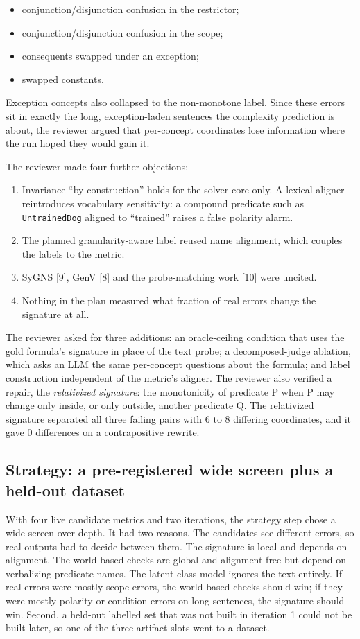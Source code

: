 \documentclass[11pt,letterpaper]{article}
\begin{document}
\begin{itemize}
\item {}conjunction/disjunction confusion in the restrictor;
\item {}conjunction/disjunction confusion in the scope;
\item {}consequents swapped under an exception;
\item {}swapped constants.
\end{itemize}
Exception concepts also collapsed to the non-monotone label. Since these errors sit in exactly the long, exception-laden sentences the complexity prediction is about, the reviewer argued that per-concept coordinates lose information where the run hoped they would gain it.

The reviewer made four further objections:

\begin{enumerate}
\item {}Invariance ``by construction'' holds for the solver core only. A lexical aligner reintroduces vocabulary sensitivity: a compound predicate such as \texttt{UntrainedDog} aligned to ``trained'' raises a false polarity alarm.
\item {}The planned granularity-aware label reused name alignment, which couples the labels to the metric.
\item {}SyGNS [9], GenV [8] and the probe-matching work [10] were uncited.
\item {}Nothing in the plan measured what fraction of real errors change the signature at all.
\end{enumerate}
The reviewer asked for three additions: an oracle-ceiling condition that uses the gold formula's signature in place of the text probe; a decomposed-judge ablation, which asks an LLM the same per-concept questions about the formula; and label construction independent of the metric's aligner. The reviewer also verified a repair, the \emph{relativized signature}: the monotonicity of predicate P when P may change only inside, or only outside, another predicate Q. The relativized signature separated all three failing pairs with 6 to 8 differing coordinates, and it gave 0 differences on a contrapositive rewrite.

\subsection{Strategy: a pre-registered wide screen plus a held-out dataset}

With four live candidate metrics and two iterations, the strategy step chose a wide screen over depth. It had two reasons. The candidates see different errors, so real outputs had to decide between them. The signature is local and depends on alignment. The world-based checks are global and alignment-free but depend on verbalizing predicate names. The latent-class model ignores the text entirely. If real errors were mostly scope errors, the world-based checks should win; if they were mostly polarity or condition errors on long sentences, the signature should win. Second, a held-out labelled set that was not built in iteration 1 could not be built later, so one of the three artifact slots went to a dataset.
\end{document}
